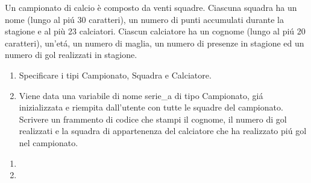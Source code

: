 \begin{Exercise}[label={ex:capocannoniere}]
		Un campionato di calcio \`e composto da venti squadre. Ciascuna squadra ha un nome (lungo al pi\'u 30 caratteri), un numero di punti accumulati durante la stagione e al più 23 calciatori. Ciascun calciatore ha un cognome (lungo al pi\'u 20 caratteri), un'et\'a, un numero di maglia, un numero di presenze in stagione ed un numero di gol realizzati in stagione.
		\begin{enumerate}
			\item Specificare i tipi Campionato, Squadra e Calciatore.
			\item Viene data una variabile di nome serie\_a di tipo Campionato, gi\'a inizializzata e riempita dall'utente con tutte le squadre del campionato. Scrivere un frammento di codice che stampi il cognome, il numero di gol realizzati e la squadra di appartenenza del calciatore che ha realizzato pi\'u gol nel campionato.
		\end{enumerate}
\end{Exercise}

\begin{Answer}[ref={ex:capocannoniere}]
	\begin{enumerate}
		\item 
		
		\item 
	\end{enumerate}
\end{Answer}